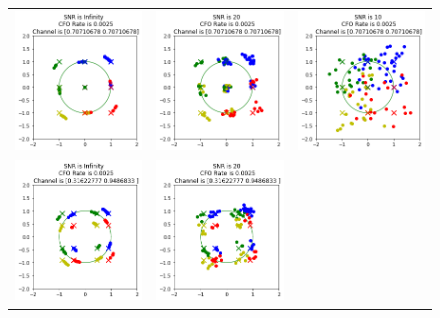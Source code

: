 \begin{figure}
\begin{tabular}{ccc}
    \includegraphics[width=45mm]{figures/cfo_equal_intro/snr_0_c2/cfo_0.png}&
    \includegraphics[width=45mm]{figures/cfo_equal_intro/snr_20_c2/cfo_0.png}&
    \includegraphics[width=45mm]{figures/cfo_equal_intro/snr_10_c2/cfo_0.png}\\
    \includegraphics[width=45mm]{figures/cfo_equal_intro/snr_0_c4/cfo_0.png}&
    \includegraphics[width=45mm]{figures/cfo_equal_intro/snr_20_c4/cfo_0.png}&

\end{tabular}
\end{figure}
